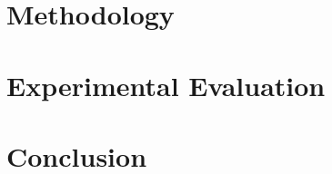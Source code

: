 \documentclass[sigconf]{acmart}
\begin{document}
	
	\section{Methodology}
	\label{sec:method}
	
	
	
	\section{Experimental Evaluation}
	\label{sec:evaluation}
	
	
	
	\section{Conclusion}
	\label {sec:conclusion}
	
	
	
	
	
	
	
	
	
\end{document}
